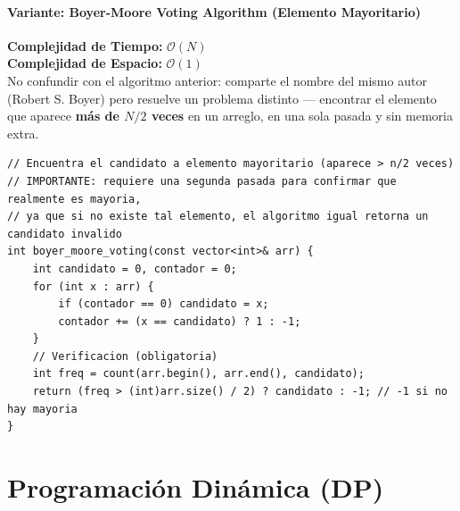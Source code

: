 \documentclass[10pt,twocolumn,letterpaper]{report}
\begin{document}
\subsubsection{Variante: Boyer-Moore Voting Algorithm (Elemento Mayoritario)}
\textbf{Complejidad de Tiempo:} $\mathcal{O}(N)$ \\
\textbf{Complejidad de Espacio:} $\mathcal{O}(1)$ \\
No confundir con el algoritmo anterior: comparte el nombre del mismo autor (Robert S. Boyer) pero resuelve un problema distinto — encontrar el elemento que aparece \textbf{más de $N/2$ veces} en un arreglo, en una sola pasada y sin memoria extra.
\begin{lstlisting}
// Encuentra el candidato a elemento mayoritario (aparece > n/2 veces)
// IMPORTANTE: requiere una segunda pasada para confirmar que realmente es mayoria,
// ya que si no existe tal elemento, el algoritmo igual retorna un candidato invalido
int boyer_moore_voting(const vector<int>& arr) {
    int candidato = 0, contador = 0;
    for (int x : arr) {
        if (contador == 0) candidato = x;
        contador += (x == candidato) ? 1 : -1;
    }
    // Verificacion (obligatoria)
    int freq = count(arr.begin(), arr.end(), candidato);
    return (freq > (int)arr.size() / 2) ? candidato : -1; // -1 si no hay mayoria
}
\end{lstlisting}
\chapter{Programación Dinámica (DP)}

\end{document}
